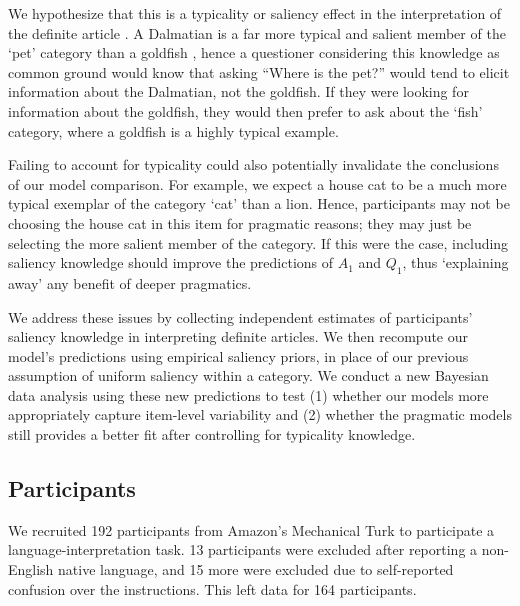 \documentclass[12pt, floatsintext, jou]{apa6}
\begin{document}

We hypothesize that this is a typicality or saliency effect in the interpretation of the definite article \cite{Strawson50_OnReferring, ClarkSchreuderButtrick83_CommonGroundUnderstanding}. A Dalmatian is a far more typical and salient member of the `pet' category than a goldfish \cite{Rosch75}, hence a questioner considering this knowledge as common ground would know that asking ``Where is the pet?'' would tend to elicit information about the Dalmatian, not the goldfish. If they were looking for information about the goldfish, they would then prefer to ask about the `fish' category, where a goldfish is a highly typical example. 

Failing to account for typicality could also potentially invalidate the conclusions of our model comparison. For example, we expect a house cat to be a much more typical exemplar of the category `cat' than a lion. Hence, participants may not be choosing the house cat in this item for pragmatic reasons; they may just be selecting the more salient member of the category. If this were the case, including saliency knowledge should improve the predictions of $A_1$ and $Q_1$, thus `explaining away' any benefit of deeper pragmatics. 


We address these issues by collecting independent estimates of participants' saliency knowledge in interpreting definite articles. We then recompute our model's predictions using empirical saliency priors, in place of our previous assumption of uniform saliency within a category. We conduct a new Bayesian data analysis using these new predictions to test (1) whether our models more appropriately capture item-level variability and (2) whether the pragmatic models still provides a better fit after controlling for typicality knowledge.

\subsection{Participants} 
We recruited 192 participants from Amazon's Mechanical Turk to participate a language-interpretation task. 13 participants were excluded after reporting a non-English native language, and 15 more were excluded due to self-reported confusion over the instructions. This left data for 164 participants.
\end{document}
